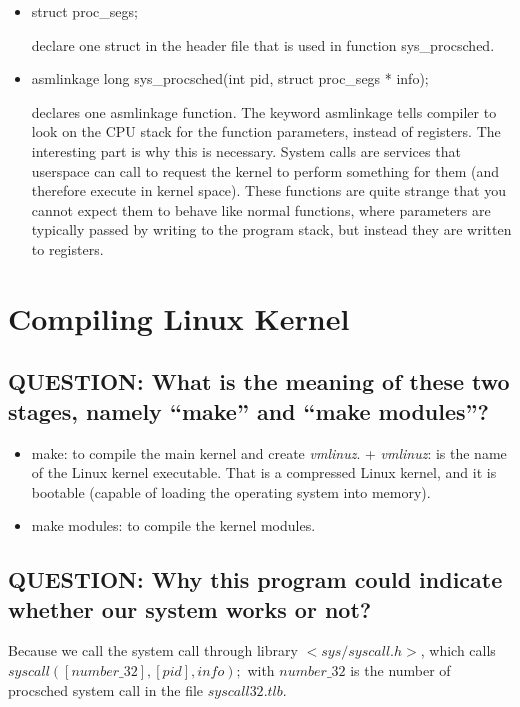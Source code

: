 \begin{itemize}
	\item struct proc\_segs;
	
	declare one struct in the header file that is used in function sys\_procsched.
	
	\item asmlinkage long sys\_procsched(int pid, struct proc\_segs * info);
	
	declares one asmlinkage function. The keyword asmlinkage tells compiler to look on the CPU stack for the function parameters, instead of registers. The interesting part is why this is necessary. System calls are services that userspace can call to request the kernel to perform something for them (and therefore execute in kernel space). These functions are quite strange that you cannot expect them to behave like normal functions, where parameters are typically passed by writing to the program stack, but instead they are written to registers. 
\end{itemize}
 

\section{Compiling Linux Kernel}

\subsection{QUESTION: What is the meaning of these two stages, namely “make” and “make modules”?}

\begin{itemize}
	\item make: to compile the main kernel and create \textit{vmlinuz}.
	\subitem + \textit{vmlinuz}: is the name of the Linux kernel executable. That is a compressed Linux kernel, and it is bootable (capable of loading the operating system into memory).
	\item make modules: to compile the kernel modules.
\end{itemize}






\subsection{QUESTION: Why this program could indicate whether our system works or not?}


Because we call the system call through library $ <sys/syscall.h> $, which calls  $ syscall ([ number\_32], [pid], info); $ with $ number\_32 $ is the number of procsched system call in the file $ syscall 32.tlb $.

